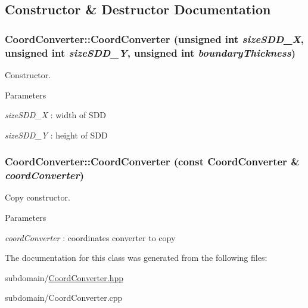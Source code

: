 \subsection{Constructor \& Destructor Documentation}
\hypertarget{classCoordConverter_a0e773a3ee5461119d7ff285fde45427d}{
\subsubsection[{CoordConverter}]{\setlength{\rightskip}{0pt plus 5cm}CoordConverter::CoordConverter (unsigned int {\em sizeSDD\_\-X}, \/  unsigned int {\em sizeSDD\_\-Y}, \/  unsigned int {\em boundaryThickness})}}
\label{classCoordConverter_a0e773a3ee5461119d7ff285fde45427d}


Constructor. 
\begin{DoxyParams}{Parameters}
\item[{\em sizeSDD\_\-X}]: width of SDD \item[{\em sizeSDD\_\-Y}]: height of SDD \end{DoxyParams}
\hypertarget{classCoordConverter_af11209a489a46dd335db0635d811999d}{
\subsubsection[{CoordConverter}]{\setlength{\rightskip}{0pt plus 5cm}CoordConverter::CoordConverter (const {\bf CoordConverter} \& {\em coordConverter})}}
\label{classCoordConverter_af11209a489a46dd335db0635d811999d}


Copy constructor. 
\begin{DoxyParams}{Parameters}
\item[{\em coordConverter}]: coordinates converter to copy \end{DoxyParams}


The documentation for this class was generated from the following files:\begin{DoxyCompactItemize}
\item 
subdomain/\hyperlink{CoordConverter_8hpp}{CoordConverter.hpp}\item 
subdomain/CoordConverter.cpp\end{DoxyCompactItemize}
